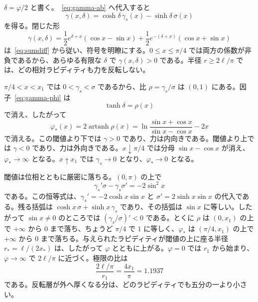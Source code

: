\documentclass[a4paper]{article}
\begin{document}
\(\delta=\varphi/2\) と書く。~\eqref{eq:gamma-ab} へ代入すると
\begin{equation}
\label{eq:gamma-phi}
\gamma(x,\delta)
  =\cosh\delta\,\gamma_s(x)-\sinh\delta\,\sigma(x)
\end{equation}
を得る。閉じた形
\begin{equation}
\label{eq:gamma-closed}
\gamma(x,\delta)
  =\frac12 e^{\delta+x}(\cos x-\sin x)
  +\frac12 e^{-(\delta+x)}(\cos x+\sin x)
\end{equation}
は~\eqref{eq:sumdiff} から従い、符号を明瞭にする。\(0\le x\le\pi/4\) では両方の係数が非負であるから、あらゆる有限な \(\delta\) で \(\gamma(x,\delta)>0\) である。半径 \(r\ge 2\ell/\pi\) では、どの相対ラピディティも力を反転しない。

\(\pi/4<x<x_1\) では \(0<\gamma_s<\sigma\) であるから、比 \(\rho=\gamma_s/\sigma\) は \((0,1)\) にある。因子~\eqref{eq:gamma-phi} は
\[
\tanh\delta=\rho(x)
\]
で消え、したがって
\begin{equation}
\label{eq:phi-star}
\varphi_*(x)
  =2\operatorname{artanh}\rho(x)
  =\ln\frac{\sin x+\cos x}{\sin x-\cos x}-2x
\end{equation}
で消える。この閾値より下では \(\gamma>0\) であり、力は内向きである。閾値より上では \(\gamma<0\) であり、力は外向きである。\(x\downarrow\pi/4\) では分母 \(\sin x-\cos x\) が消え、\(\varphi_*\to\infty\) となる。\(x\uparrow x_1\) では \(\gamma_s\to 0\) となり、\(\varphi_*\to 0\) となる。

閾値は位相とともに厳密に落ちる。\((0,\pi)\) の上で
\begin{equation}
\label{eq:rho-derivative}
\gamma_s'\sigma-\gamma_s\sigma'
  =-2\sin^{2}x
\end{equation}
である。この恒等式は、\(\gamma_s'=-2\cosh x\sin x\) と \(\sigma'=2\sinh x\sin x\) の代入である。残る括弧は \(\cosh x\,\sigma+\sinh x\,\gamma_s\) であり、その括弧は \(\sin x\) に等しい。したがって \(\sin x\neq 0\) のところでは \((\gamma_s/\sigma)'<0\) である。とくに \(\rho\) は \((0,x_1)\) の上で \(+\infty\) から \(0\) まで落ち、ちょうど \(\pi/4\) で \(1\) に等しく、\(\varphi_*\) は \((\pi/4,x_1)\) の上で \(+\infty\) から \(0\) まで落ちる。与えられたラピディティが閾値の上に座る半径 \(r_*=\ell/(2x_*)\) は、したがって \(\varphi\) とともに上がる。\(\varphi=0\) では \(r_1\) から始まり、\(\varphi\to\infty\) で \(2\ell/\pi\) に近づく。極限の比は
\begin{equation}
\label{eq:limit-ratio}
\frac{2\ell/\pi}{r_1}=\frac{4x_1}{\pi}=1.1937
\end{equation}
である。反転層が外へ厚くなる分は、どのラピディティでも五分の一より小さい。
\end{document}
